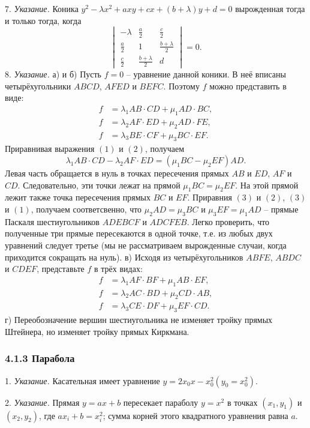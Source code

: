 7. \textit{Указание.} Коника $y^2 - \lambda x^2 + axy + cx + (b + \lambda)y + d = 0$ вырожденная тогда и только тогда, когда
$$
\begin{vmatrix}
	-\lambda & \frac{a}{2} & \frac{c}{2} \\
	\frac{a}{2} & 1 & \frac{b + \lambda}{2} \\
	\frac{c}{2} & \frac{b + \lambda}{2} & d 
\end{vmatrix} = 0.
$$
8. \textit{Указание.} а) и б) Пусть $f = 0$ -- уравнение данной коники. В неё вписаны четырёхугольники $ABCD$, $AFED$ и $BEFC$. Поэтому $f$ можно представить в виде:
\begin{align*}
	f &= \lambda_1 AB \cdot CD + \mu_1 AD \cdot BC, \tag{1} \\
	f &= \lambda_2 AF \cdot ED + \mu_2 AD \cdot FE, \tag{2} \\
	f &= \lambda_3 BE \cdot CF + \mu_3 BC \cdot EF. \tag{3}
\end{align*}
Приравнивая выражения $(1)$ и $(2)$, получаем
\[
	\lambda_1 AB \cdot CD - \lambda_2 AF \cdot ED = (\mu_1 BC - \mu_2 EF) AD.
\]
Левая часть обращается в нуль в точках пересечения прямых $AB$ и $ED$, $AF$ и $CD$. Следовательно, эти точки лежат на прямой $\mu_1 BC = \mu_2 EF$. На этой прямой лежит также точка пересечения прямых $BC$ и $EF$.
Приравния $(3)$ и $(2)$, $(3)$ и $(1)$, получаем соответсвенно, что $\mu_2 AD = \mu_3 BC$ и $\mu_3 EF = \mu_1 AD$ -- прямые Паскаля шестиугольников $ADEBCF$ и $ADCFEB$. Легко проверить, что полученные три прямые пересекаются в одной точке, т.е. из любых двух уравнений следует третье (мы не рассматриваем вырожденные случаи, когда приходится сокращать на нуль).
в) Исходя из четырёхугольников $ABFE$, $ABDC$ и $CDEF$, представьте $f$ в трёх видах:
\begin{align*}
	f &= \lambda_1 AF \cdot BF + \mu_1 AB \cdot EF, \\
	f &= \lambda_2 AC \cdot BD + \mu_2 CD \cdot AB, \\
	f &= \lambda_3 CE \cdot DF + \mu_3 EF \cdot CD. 
\end{align*}
г) Переобозначение вершин шестиугольника не изменяет тройку прямых Штейнера, но изменяет тройку прямых Киркмана.
\subsubsection*{4.1.3 Парабола}
1. \textit{Указание.} Касательная имеет уравнение $y = 2x_0 x - x_0^2(y_0 = x_0^2)$.

2. \textit{Указание.} Прямая $y = ax + b$ пересекает параболу $y = x^2$ в точках $(x_1, y_1)$ и $(x_2, y_2)$, где $ax_i + b = x_i^2$; сумма корней этого квадратного уравнения равна $a$.


